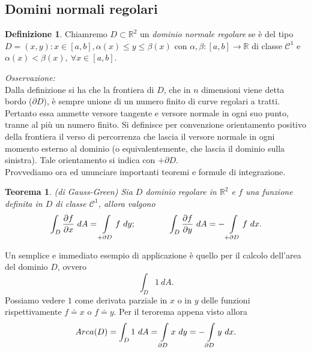 \documentclass[10pt]{article}
\theoremstyle{plain}
\newtheorem{thm}{Teorema}[section]
\theoremstyle{definition}
\newtheorem{defn}{Definizione}
\begin{document}
\subsection{Domini normali regolari}
\begin{defn}
Chiamremo $D\subset \mathbb{R}^2$ un \textit{dominio normale regolare} se è del tipo $D={(x,y):x\in[a,b], \alpha(x)\leq y \leq \beta(x)}$ con $\alpha, \beta:[a,b]\to \mathbb{R}$ di classe $\mathcal{C}^1$ e $\alpha(x)<\beta(x),\ \forall x\in[a,b]$.
\end{defn}
\bigskip
\textit{Osservazione:}
\\ Dalla definizione si ha che la frontiera di $D$, che in $n$ dimensioni viene detta bordo ($\partial D$), è sempre unione di un numero finito di curve regolari a tratti. Pertanto essa ammette versore tangente e versore normale in ogni suo punto, tranne al più un numero finito. Si definisce per convenzione orientamento positivo della frontiera il verso di percorrenza che lascia il versore normale in ogni momento esterno al dominio (o equivalentemente, che lascia il dominio sulla sinistra). Tale orientamento si indica con $ +\partial D$.
\\
Provvediamo ora ed ununciare importanti teoremi e formule di integrazione.
\begin{thm}
(di Gauss-Green)
Sia $D$ dominio regolare in $\mathbb{R}^2$ e $f$ una funzione definita in $D$ di classe $\mathcal{C}^1$, allora valgono
$$\int_D\frac{\partial f}{\partial x}\ dA = \int\displaylimits_{+\partial D}f\ dy;\qquad \qquad   \int_D\frac{\partial f}{\partial y}\ dA = -\int\displaylimits_{+\partial D}f\ dx.
$$
\end{thm}
\bigskip
Un semplice e immediato esempio di applicazione è quello per il calcolo dell'area del dominio $D$, ovvero
$$\int_D1\ dA. $$ Possiamo vedere $1$ come derivata parziale in $x$ o in $y$ delle funzioni rispettivamente $f\doteq x$ o $f\doteq y$.
Per il terorema appena visto allora
$$Area(D)=\int_D1\ dA = \int\displaylimits_{\partial D}x\ dy= -\int\displaylimits_{\partial D}y\ dx.
$$
\end{document}
